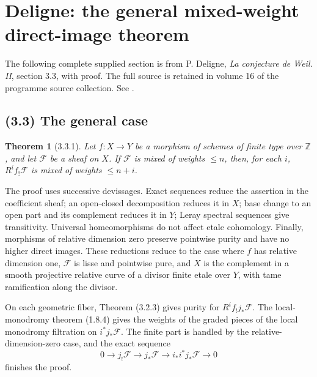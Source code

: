 \documentclass[11pt,a4paper]{article}
\newtheorem{theorem}{Theorem}[section]
\begin{document}

\endgroup

\clearpage
\begingroup

\def\Fq{\mathbb F_q}\def\Ql{\mathbb Q_\ell}\def\Spec{\operatorname{Spec}}
\setcounter{equation}{0}
\renewcommand{\theequation}{D33.\arabic{equation}}
\section*{Deligne: the general mixed-weight direct-image theorem}
The following complete supplied section is from P. Deligne, \emph{La conjecture de Weil. II}, section 3.3, with proof. The full source is retained in volume 16 of the programme source collection. See \cite{et:Deligne}.
\subsection*{(3.3) The general case}

\begin{theorem}[3.3.1]
Let $f:X\to Y$ be a morphism of schemes of finite type over $\mathbb Z$, and let $\mathcal F$ be a sheaf on $X$. If $\mathcal F$ is mixed of weights $\le n$, then, for each $i$, $R^if_{!}\mathcal F$ is mixed of weights $\le n+i$.
\end{theorem}

The proof uses successive devissages. Exact sequences reduce the assertion in the coefficient sheaf; an open-closed decomposition reduces it in $X$; base change to an open part and its complement reduces it in $Y$; Leray spectral sequences give transitivity. Universal homeomorphisms do not affect etale cohomology. Finally, morphisms of relative dimension zero preserve pointwise purity and have no higher direct images. These reductions reduce to the case where $f$ has relative dimension one, $\mathcal F$ is lisse and pointwise pure, and $X$ is the complement in a smooth projective relative curve of a divisor finite etale over $Y$, with tame ramification along the divisor.

On each geometric fiber, Theorem (3.2.3) gives purity for $R^if_{!}j_{*}\mathcal F$. The local-monodromy theorem (1.8.4) gives the weights of the graded pieces of the local monodromy filtration on $i^*j_{*}\mathcal F$. The finite part is handled by the relative-dimension-zero case, and the exact sequence
\[
0\to j_{!}\mathcal F\to j_{*}\mathcal F\to i_{*}i^*j_{*}\mathcal F\to0
\]
finishes the proof.
\end{document}
